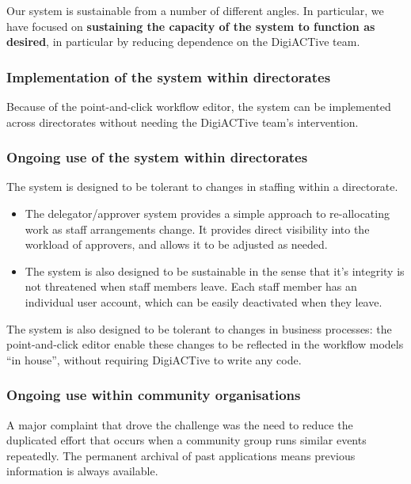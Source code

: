 \documentclass[12pt,a4paper,twosided]{article}
\begin{document}
Our system is sustainable from a number of different angles. In
particular, we have focused on \textbf{sustaining the capacity of the
system to function as desired}, in particular by reducing dependence on
the DigiACTive team.

\subsubsection{Implementation of the system within directorates}

Because of the point-and-click workflow editor, the system can be
implemented across directorates without needing the DigiACTive team's
intervention.

\subsubsection{Ongoing use of the system within directorates}

The system is designed to be tolerant to changes in staffing within a
directorate.

\begin{itemize}

\item The delegator/approver system provides a simple approach to
  re-allocating work as staff arrangements change. It provides direct
  visibility into the workload of approvers, and allows it to be
  adjusted as needed.
\item
  The system is also designed to be sustainable in the sense that it's
  integrity is not threatened when staff members leave. Each staff
  member has an individual user account, which can be easily deactivated
  when they leave.
\end{itemize}

The system is also designed to be tolerant to changes in business
processes: the point-and-click editor enable these changes to be
reflected in the workflow models ``in house'', without requiring
DigiACTive to write any code.

\subsubsection{Ongoing use within community organisations}

A major complaint that drove the challenge was the need to reduce the
duplicated effort that occurs when a community group runs similar events
repeatedly. The permanent archival of past applications means previous
information is always available.
\end{document}
